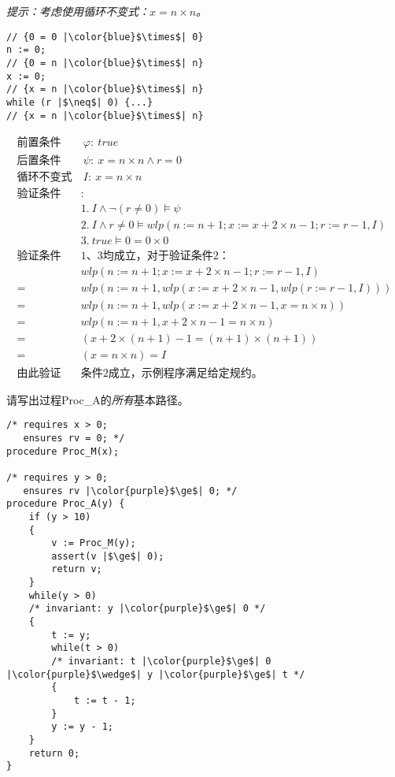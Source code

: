 \documentclass[11pt,a4paper]{article}
\begin{document}
\textit{提示：考虑使用循环不变式：$x = n \times n$。}
\begin{solution}
\begin{lstlisting}
// {0 = 0 |\color{blue}$\times$| 0}
n := 0;
// {0 = n |\color{blue}$\times$| n}
x := 0;
// {x = n |\color{blue}$\times$| n}
while (r |$\neq$| 0) {...}
// {x = n |\color{blue}$\times$| n}
\end{lstlisting}
	\begin{align*}
		\text{前置条件}&\ \varphi:\ true \\
		\text{后置条件}&\ \psi:\ x=n\times n \land r=0 \\
		\text{循环不变式}&\ I:\ x=n\times n \\
		\text{验证条件}&:\\
		&1.\ I\land \neg(r\neq 0)\models \psi \\
		&2.\ I\land r\neq 0 \models wlp(n:=n+1;x:=x+2\times n-1;r:=r-1,I) \\
		&3.\ true\models 0=0\times 0 \\
		\text{验证条件}&\text{1、3均成立，对于验证条件2：}\\
		&wlp(n:=n+1;x:=x+2\times n-1;r:=r-1,I)\\
		=\ &wlp(n:=n+1,wlp(x:=x+2\times n-1,wlp(r:=r-1,I))) \\
		=\ &wlp(n:=n+1,wlp(x:=x+2\times n-1,x=n\times n)) \\
		=\ &wlp(n:=n+1,x+2\times n-1=n\times n) \\
		=\ &(x+2\times(n+1)-1=(n+1)\times(n+1)) \\
		=\ &(x=n\times n)=I \\
		\text{由此验证}&\text{条件2成立，示例程序满足给定规约。}
	\end{align*}
\end{solution}
\newpage
{}
\subproblem 请写出过程Proc\_A的\emph{所有}基本路径。
\begin{lstlisting}
/* requires x > 0;
   ensures rv = 0; */
procedure Proc_M(x);

/* requires y > 0;
   ensures rv |\color{purple}$\ge$| 0; */
procedure Proc_A(y) {
    if (y > 10)
    {
        v := Proc_M(y);
        assert(v |$\ge$| 0);
        return v;
    }
    while(y > 0)
    /* invariant: y |\color{purple}$\ge$| 0 */
    {
        t := y;
        while(t > 0)
        /* invariant: t |\color{purple}$\ge$| 0 |\color{purple}$\wedge$| y |\color{purple}$\ge$| t */
        {
            t := t - 1;
        }
        y := y - 1;
    }
    return 0;
}

\end{lstlisting}
\end{document}
